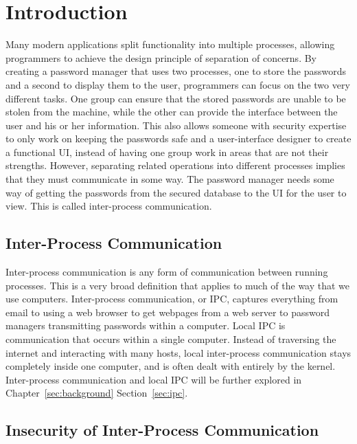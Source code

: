 \chapter{Introduction}
\label{sec:intro}

Many modern applications split functionality into multiple processes, allowing programmers to achieve the design principle of separation of concerns.  By creating a password manager that uses two processes, one to store the passwords and a second to display them to the user, programmers can focus on the two very different tasks.  One group can ensure that the stored passwords are unable to be stolen from the machine, while the other can provide the interface between the user and his or her information.  This also allows someone with security expertise to only work on keeping the passwords safe and a user-interface designer to create a functional UI, instead of having one group work in areas that are not their strengths.  However, separating related operations into different processes implies that they must communicate in some way.  The password manager needs some way of getting the passwords from the secured database to the UI for the user to view.  This is called inter-process communication.

\section{Inter-Process Communication}
Inter-process communication is any form of communication between running processes.  This is a very broad definition that applies to much of the way that we use computers.  Inter-process communication, or IPC, captures everything from email to using a web browser to get webpages from a web server to password managers transmitting passwords within a computer.  Local IPC is communication that occurs within a single computer.  Instead of traversing the internet and interacting with many hosts, local inter-process communication stays completely inside one computer, and is often dealt with entirely by the kernel.  Inter-process communication and local IPC will be further explored in Chapter~\ref{sec:background} Section~\ref{sec:ipc}.

\section{Insecurity of Inter-Process Communication}
